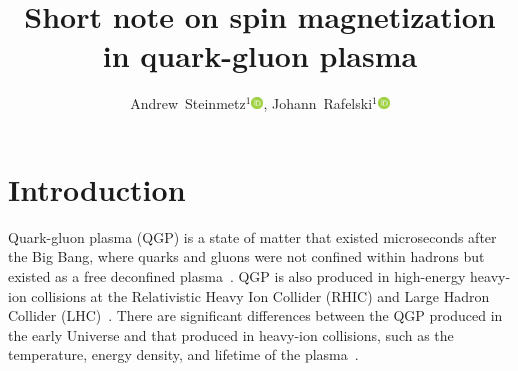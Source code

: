 \documentclass[epjST]{svjour}
\newcommand{\orcidicon}{\includegraphics[width=0.32cm]{orcid.pdf}}
\newcommand{\orc}[1]{\href{https://orcid.org/#1}{\orcidicon}}
\newcommand{\orcJR}{0000-0001-8217-1484}
\newcommand{\orcAJS}{0000-0001-5474-2649}
\numberwithin{equation}{section}
\begin{document}
\title{Short note on spin magnetization in quark-gluon plasma
    }

\author{
    Andrew~Steinmetz${}^1$\orc{\orcAJS},
    Johann~Rafelski${}^1$\orc{\orcJR}
    }



\maketitle

\section{Introduction}
\label{sec:introduction}
Quark-gluon plasma (QGP) is a state of matter that existed microseconds after the Big Bang, where quarks and gluons were not confined within hadrons but existed as a free deconfined plasma~\cite{Letessier:2002ony,Rafelski:2015cxa,Rafelski:2023emw,Rafelski:2024fej,Shuryak:2004cy,HotQCD:2014kol}. QGP is also produced in high-energy heavy-ion collisions at the Relativistic Heavy Ion Collider (RHIC) and Large Hadron Collider (LHC)~\cite{Rafelski:1982pu,STAR:2005gfr,Palni:2024wdy,Mu:2025gtr}. There are significant differences between the QGP produced in the early Universe and that produced in heavy-ion collisions, such as the temperature, energy density, and lifetime of the plasma~\cite{Rafelski:2015cxa,Rafelski:2023emw,Rafelski:2024fej}.
\end{document}
